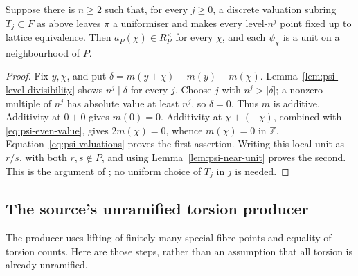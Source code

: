 \begin{srtheorem}
\label{thm:psi-height-one-unit}
Suppose there is \(n\geq2\) such that, for every \(j\geq0\), a discrete
valuation subring \(T_j\subset F\) as above leaves \(\pi\) a uniformiser
and makes every level-\(n^j\) point fixed up to lattice equivalence.
Then \(a_P(\chi)\in R_P^\times\) for every \(\chi\), and each
\(\psi_\chi\) is a unit on a neighbourhood of \(P\).
\end{srtheorem}
\begin{proof}
Fix \(y,\chi\), and put
\(\delta=m(y+\chi)-m(y)-m(\chi)\).
Lemma~\ref{lem:psi-level-divisibility} shows \(n^j\mid\delta\) for
every \(j\).  Choose \(j\) with \(n^j>|\delta|\); a nonzero multiple of
\(n^j\) has absolute value at least \(n^j\), so \(\delta=0\).
Thus \(m\) is additive.  Additivity at \(0+0\) gives \(m(0)=0\).
Additivity at \(\chi+(-\chi)\), combined with
\eqref{eq:psi-even-value}, gives \(2m(\chi)=0\), whence \(m(\chi)=0\)
in \(\mathbb Z\).
Equation~\eqref{eq:psi-valuations} proves the first assertion.
Writing this local unit as \(r/s\), with both \(r,s\notin P\), and
using Lemma~\ref{lem:psi-near-unit} proves the second.
This is the argument of ; no uniform
choice of \(T_j\) in \(j\) is needed.
\end{proof}

\subsection{The source's unramified torsion producer}
The producer  uses lifting of
finitely many special-fibre points and equality of torsion counts.
Here are those steps, rather than an assumption that all torsion is
already unramified.

